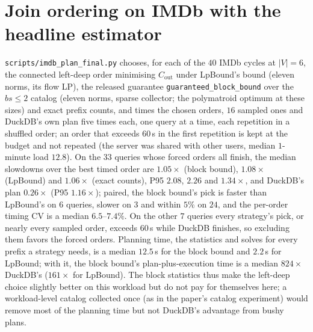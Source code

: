 \documentclass[11pt]{article}
\begin{document}
\section{Join ordering on IMDb with the headline estimator}
\texttt{scripts/imdb\_plan\_final.py} chooses, for each of the $40$ IMDb
cycles at $|V|{=}6$, the connected left-deep order minimising
$C_{\mathrm{out}}$ under LpBound's bound (eleven norms, its flow LP), the
released guarantee \texttt{guaranteed\_block\_bound} over the $bs{\le}2$
catalog (eleven norms, sparse collector; the polymatroid optimum at these
sizes) and exact prefix counts, and times the chosen orders, $16$ sampled
ones and DuckDB's own plan five times each, one query at a time, each
repetition in a shuffled order; an order that exceeds $60$\,s in the first
repetition is kept at the budget and not repeated (the server was shared
with other users, median $1$-minute load $12.8$). On the $33$ queries whose
forced orders all finish, the median slowdowns over the best timed order are
$1.05\times$ (block bound), $1.08\times$ (LpBound) and $1.06\times$ (exact
counts), P95 $2.08$, $2.26$ and $1.34\times$, and DuckDB's plan $0.26\times$
(P95 $1.16\times$); paired, the block bound's pick is faster than LpBound's on $6$ queries, slower on $3$ and within $5\%$ on $24$, and the per-order timing CV is a median $6.5$--$7.4\%$. On the other $7$ queries every strategy's pick, or nearly every sampled order, exceeds $60$\,s while DuckDB finishes, so excluding them favors the forced orders. Planning time, the statistics and solves for every prefix a
strategy needs, is a median $12.5$\,s for the block bound and $2.2$\,s for
LpBound; with it, the block bound's plan-plus-execution time is a median
$824\times$ DuckDB's ($161\times$ for LpBound). The block statistics thus make
the left-deep choice slightly better on this workload but do not pay for
themselves here; a workload-level catalog collected once (as in the paper's
catalog experiment) would remove most of the planning time but not DuckDB's
advantage from bushy plans.
\end{document}
